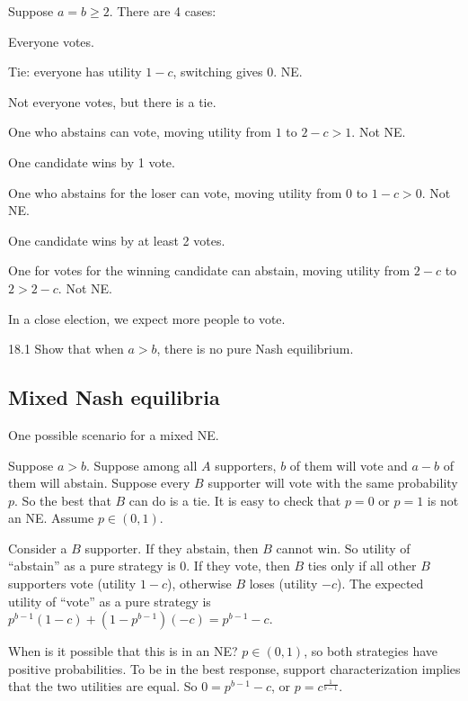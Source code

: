 \documentclass[12pt,letterpaper]{report}
\begin{document}
Suppose $a = b \geq 2$.
There are 4 cases:
\begin{enumcase}
  \item
  Everyone votes.

  Tie: everyone has utility $1 - c$, switching gives $0$.
  NE.
  \item
  Not everyone votes, but there is a tie.

  One who abstains can vote, moving utility from $1$ to $2 - c > 1$.
  Not NE.
  \item
  One candidate wins by 1 vote.

  One who abstains for the loser can vote, moving utility from $0$ to $1 - c > 0$.
  Not NE.
  \item
  One candidate wins by at least 2 votes.

  One for votes for the winning candidate can abstain, moving utility from $2 - c$ to $2 > 2 - c$.
  Not NE.
\end{enumcase}
In a close election, we expect more people to vote.

\begin{exer}{}{18.1}
  Show that when $a > b$, there is no pure Nash equilibrium.
\end{exer}

\subsection{Mixed Nash equilibria}

One possible scenario for a mixed NE.

Suppose $a > b$.
Suppose among all $A$ supporters, $b$ of them will vote and $a - b$ of them will abstain.
Suppose every $B$ supporter will vote with the same probability $p$.
So the best that $B$ can do is a tie.
It is easy to check that $p = 0$ or $p = 1$ is not an NE.
Assume $p \in (0, 1)$.

Consider a $B$ supporter.
If they abstain, then $B$ cannot win.
So utility of ``abstain'' as a pure strategy is 0.
If they vote, then $B$ ties only if all other $B$ supporters vote (utility $1 - c$), otherwise $B$
loses (utility $-c$).
The expected utility of ``vote'' as a pure strategy is
$p^{b - 1} (1 - c) + (1 - p^{b - 1}) (-c) = p^{b - 1} - c$.

When is it possible that this is in an NE?
$p \in (0, 1)$, so both strategies have positive probabilities.
To be in the best response, support characterization implies that the two utilities are equal.
So $0 = p^{b - 1} - c$, or $p = c^{\frac{1}{b - 1}}$.
\end{document}
